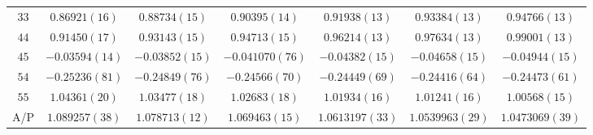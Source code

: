 \begin{table}
\begin{center}
\begin{tabular}{c|c c c c c c}
$33$ & $0.86921(16)$ & $0.88734(15)$ & $0.90395(14)$ & $0.91938(13)$ & $0.93384(13)$ & $0.94766(13)$ \\
$44$ & $0.91450(17)$ & $0.93143(15)$ & $0.94713(15)$ & $0.96214(13)$ & $0.97634(13)$ & $0.99001(13)$ \\
$45$ & $-0.03594(14)$ & $-0.03852(15)$ & $-0.041070(76)$ & $-0.04382(15)$ & $-0.04658(15)$ & $-0.04944(15)$ \\
$54$ & $-0.25236(81)$ & $-0.24849(76)$ & $-0.24566(70)$ & $-0.24449(69)$ & $-0.24416(64)$ & $-0.24473(61)$ \\
$55$ & $1.04361(20)$ & $1.03477(18)$ & $1.02683(18)$ & $1.01934(16)$ & $1.01241(16)$ & $1.00568(15)$ \\
\hline
A/P & $1.089257(38)$ & $1.078713(12)$ & $1.069463(15)$ & $1.0613197(33)$ & $1.0539963(29)$ & $1.0473069(39)$ \\
\hline
\hline
\end{tabular}
\end{center}
\end{table}